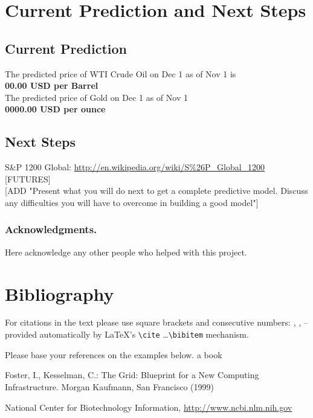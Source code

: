 \documentclass[runningheads]{llncs}
\begin{document}
\newpage

\section{Current Prediction and Next Steps}

\subsection {Current Prediction}
\noindent The predicted price of WTI Crude Oil on Dec 1 as of Nov 1 is \\
\textbf{00.00 USD per Barrel} \\

\noindent The predicted price of Gold on Dec 1 as of Nov 1 \\
\textbf{0000.00 USD per ounce} \\

\subsection {Next Steps}

S\&P 1200 Global: \url {http://en.wikipedia.org/wiki/S%26P_Global_1200} \\

[FUTURES] \\

[ADD "Present what you will do next to get a complete predictive model.  Discuss any difficulties you will have to overcome in building a good model"]

\subsubsection*{Acknowledgments.} Here acknowledge any other people who helped with this project.

\section{Bibliography}\label{references}

For citations in the text please use
square brackets and consecutive numbers: \cite{jour}, \cite{lncschap},
\cite{proceeding1} -- provided automatically
by \LaTeX 's \verb|\cite| \dots\verb|\bibitem| mechanism.

Please base your references on the
examples below. 
 a book \cite{book}

\begin{thebibliography}{4}

 Foster, I., Kesselman, C.: The Grid: Blueprint for a New Computing
Infrastructure. Morgan Kaufmann, San Francisco (1999)

 National Center for Biotechnology Information, \url{http://www.ncbi.nlm.nih.gov}

\end{thebibliography}
\end{document}

